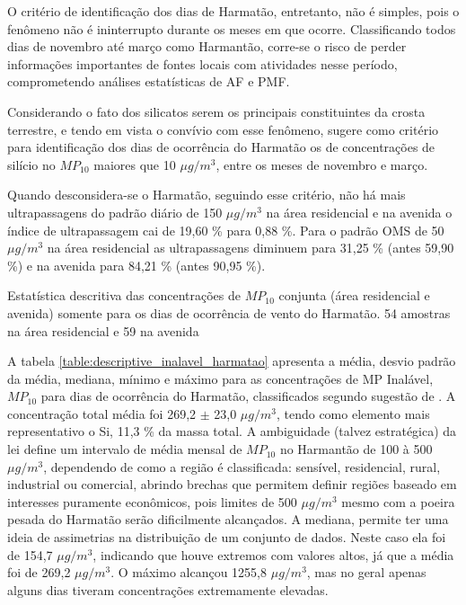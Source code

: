 O critério de identificação dos dias de Harmatão, entretanto, não é simples, 
pois o fenômeno não é ininterrupto durante os meses em que ocorre. 
Classificando todos dias de novembro até março como Harmantão, corre-se o risco 
de perder informações importantes de fontes locais com atividades nesse período, 
comprometendo análises estatísticas de AF e PMF. 

Considerando o fato dos silicatos serem os principais constituintes da crosta
terrestre, e tendo em vista o convívio com esse fenômeno, \citet{aboh2009} 
sugere como critério para identificação dos dias de ocorrência do Harmatão os de
concentrações de silício no $MP_{10}$ maiores que 10 $\mu g/m^3$, entre os meses
de novembro e março. 

Quando desconsidera-se o Harmatão, seguindo esse critério,
não há mais ultrapassagens do padrão diário de 150 $\mu g / m^3$ na área 
residencial e na avenida o índice de ultrapassagem cai de 19,60 \% para 0,88 \%. 
Para o padrão OMS de 50 $\mu g / m^3$ na área residencial as 
ultrapassagens diminuem para 31,25 \% (antes 59,90 \%) e na avenida para 
84,21 \% (antes 90,95 \%).

\begin{table}[H]
  \centering
  \caption{Estatística descritiva das concentrações de $MP_{10}$ conjunta
           (área residencial e avenida) somente para os dias de ocorrência 
           de vento do Harmatão. 54 amostras na área residencial e 59 na avenida 
          \label{table:descriptive_inalavel_harmatao}}
  
\end{table}

A tabela \ref{table:descriptive_inalavel_harmatao} apresenta a média, 
desvio padrão da média, mediana, mínimo e máximo para as concentrações de 
MP Inalável, $MP_{10}$ para dias de ocorrência do Harmatão, classificados
segundo sugestão de \citet{aboh2009}. A concentração total média foi 269,2 $\pm$ 23,0
$\mu g/ m^3$, tendo como elemento mais representativo o Si, 11,3 \% da massa total. 
A ambiguidade (talvez estratégica) da lei define um intervalo de média mensal 
de $MP_{10}$ no Harmantão de 100 à 500 $\mu g/ m^3$, dependendo de como a região
é classificada: sensível, residencial, rural, industrial ou comercial, abrindo
brechas que permitem definir regiões baseado em interesses puramente econômicos,
pois limites de 500 $\mu g/ m^3$ mesmo com a poeira pesada do Harmatão serão
dificilmente alcançados. A mediana, permite ter uma ideia de assimetrias na 
distribuição de um conjunto de dados. Neste caso ela foi de 154,7 $\mu g/ m^3$, 
indicando que houve extremos com valores altos, já que a média foi de 
269,2 $\mu g/ m^3$. O máximo alcançou 1255,8 $\mu g/ m^3$, mas no geral apenas 
alguns dias tiveram concentrações extremamente elevadas. %

